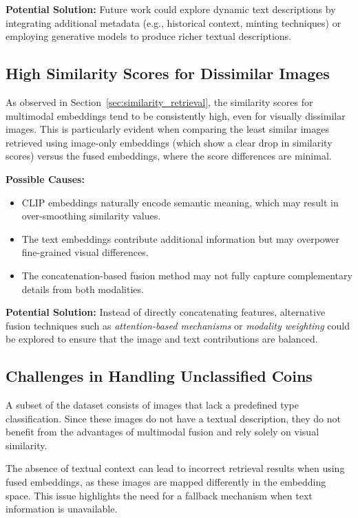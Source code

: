 \documentclass[nolibertine, english, algorithm, nomencl, minted]{ttlab-qualify}
\begin{document}
\textbf{Potential Solution:} Future work could explore dynamic text descriptions by integrating additional 
metadata (e.g., historical context, minting techniques) or employing generative models to produce richer textual descriptions.

\subsection{High Similarity Scores for Dissimilar Images}
\label{subsec:high_similarity_issue}

As observed in Section~\ref{sec:similarity_retrieval}, the similarity scores for multimodal embeddings 
tend to be consistently high, even for visually dissimilar images. This is particularly evident when comparing the 
least similar images retrieved using image-only embeddings (which show a clear drop in similarity scores)
versus the fused embeddings, where the score differences are minimal.

\textbf{Possible Causes:}
\begin{itemize}
    \item CLIP embeddings naturally encode semantic meaning, which may result in over-smoothing similarity values.
    \item The text embeddings contribute additional information but may overpower fine-grained visual differences.
    \item The concatenation-based fusion method may not fully capture complementary details from both modalities.
\end{itemize}

\textbf{Potential Solution:} Instead of directly concatenating features, alternative fusion techniques 
such as \textit{attention-based mechanisms} or \textit{modality weighting} could be explored to ensure that the image and text 
contributions are balanced.

\subsection{Challenges in Handling Unclassified Coins}
\label{subsec:unclassified_coins}

A subset of the dataset consists of images that lack a predefined type classification. 
Since these images do not have a textual description, they do not benefit from the advantages of multimodal fusion 
and rely solely on visual similarity.

The absence of textual context can lead to incorrect retrieval results when using fused embeddings, 
as these images are mapped differently in the embedding space. This issue highlights the need for a fallback mechanism 
when text information is unavailable.
\end{document}
